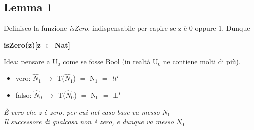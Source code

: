 \subsection{Lemma 1}
Definisco la funzione \textit{isZero}, indispensabile per capire se z \`e 0 oppure 1. Dunque\\
\begin{center}\textbf{isZero(z)[z $\in$ Nat]}\end{center}
Idea: pensare a U$_0$ come se fosse Bool (in realt\`a U$_0$ ne contiene molti di pi\`u).
\begin{itemize}
\item vero: $\hat{N}_1$ $\rightarrow$ T($\hat{N}_1$) $=$ N$_1$ $=$ \textit{tt}$^I$
\item falso: $\hat{N}_0$ $\rightarrow$ T($\hat{N}_0$) $=$ N$_0$ $=$ \textit{$\bot$}$^I$
\end{itemize}
\noindent
\textit{\`E vero che z \`e zero, per cui nel caso base va messo N$_1$\\
Il successore di qualcosa non \`e zero, e dunque va messo N$_0$}
\small
\begin{adjustwidth}{-4em}{}
\begin{prooftree}




\end{prooftree}
\end{adjustwidth}
\noindent
\normalsize
